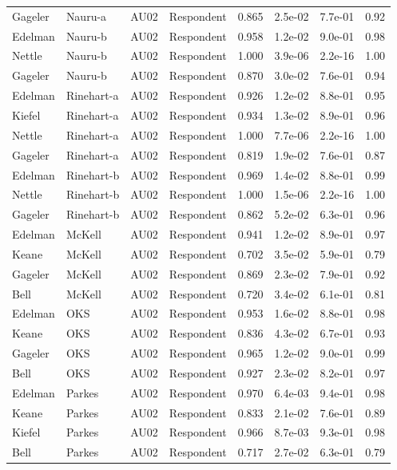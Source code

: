 \documentclass{monashthesis}
\begin{document}
\begin{center}
\begin{longtable}{llllllll}
Gageler & Nauru-a & AU02 & Respondent & 0.865 & 2.5e-02 & 7.7e-01 & 0.92 \\
Edelman & Nauru-b & AU02 & Respondent & 0.958 & 1.2e-02 & 9.0e-01 & 0.98 \\
Nettle & Nauru-b & AU02 & Respondent & 1.000 & 3.9e-06 & 2.2e-16 & 1.00 \\
Gageler & Nauru-b & AU02 & Respondent & 0.870 & 3.0e-02 & 7.6e-01 & 0.94 \\
Edelman & Rinehart-a & AU02 & Respondent & 0.926 & 1.2e-02 & 8.8e-01 & 0.95 \\
Kiefel & Rinehart-a & AU02 & Respondent & 0.934 & 1.3e-02 & 8.9e-01 & 0.96 \\
Nettle & Rinehart-a & AU02 & Respondent & 1.000 & 7.7e-06 & 2.2e-16 & 1.00 \\
Gageler & Rinehart-a & AU02 & Respondent & 0.819 & 1.9e-02 & 7.6e-01 & 0.87 \\
Edelman & Rinehart-b & AU02 & Respondent & 0.969 & 1.4e-02 & 8.8e-01 & 0.99 \\
Nettle & Rinehart-b & AU02 & Respondent & 1.000 & 1.5e-06 & 2.2e-16 & 1.00 \\
Gageler & Rinehart-b & AU02 & Respondent & 0.862 & 5.2e-02 & 6.3e-01 & 0.96 \\
Edelman & McKell & AU02 & Respondent & 0.941 & 1.2e-02 & 8.9e-01 & 0.97 \\
Keane & McKell & AU02 & Respondent & 0.702 & 3.5e-02 & 5.9e-01 & 0.79 \\
Gageler & McKell & AU02 & Respondent & 0.869 & 2.3e-02 & 7.9e-01 & 0.92 \\
Bell & McKell & AU02 & Respondent & 0.720 & 3.4e-02 & 6.1e-01 & 0.81 \\
Edelman & OKS & AU02 & Respondent & 0.953 & 1.6e-02 & 8.8e-01 & 0.98 \\
Keane & OKS & AU02 & Respondent & 0.836 & 4.3e-02 & 6.7e-01 & 0.93 \\
Gageler & OKS & AU02 & Respondent & 0.965 & 1.2e-02 & 9.0e-01 & 0.99 \\
Bell & OKS & AU02 & Respondent & 0.927 & 2.3e-02 & 8.2e-01 & 0.97 \\
Edelman & Parkes & AU02 & Respondent & 0.970 & 6.4e-03 & 9.4e-01 & 0.98 \\
Keane & Parkes & AU02 & Respondent & 0.833 & 2.1e-02 & 7.6e-01 & 0.89 \\
Kiefel & Parkes & AU02 & Respondent & 0.966 & 8.7e-03 & 9.3e-01 & 0.98 \\
Bell & Parkes & AU02 & Respondent & 0.717 & 2.7e-02 & 6.3e-01 & 0.79 \\

\end{longtable}
\end{center}
\end{document}
